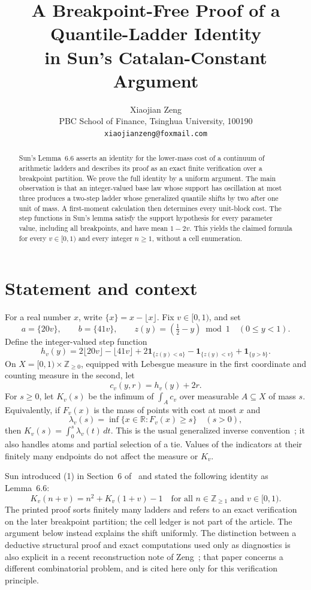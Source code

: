 \documentclass[11pt]{article}
\title{A Breakpoint-Free Proof of a Quantile-Ladder Identity\\
in Sun's Catalan-Constant Argument}
\author{Xiaojian Zeng\\
PBC School of Finance, Tsinghua University, 100190\\
\texttt{xiaojianzeng@foxmail.com}}
\date{}
\newcommand{\ind}{\mathbf 1}
\newcommand{\R}{\mathbb R}
\newcommand{\Z}{\mathbb Z}
\begin{document}
\maketitle

\begin{abstract}
Sun's Lemma~6.6 asserts an identity for the lower-mass cost of a continuum
of arithmetic ladders and describes its proof as an exact finite
verification over a breakpoint partition.  We prove the full identity by a
uniform argument.  The main observation is that an integer-valued base law
whose support has oscillation at most three produces a two-step ladder whose
generalized quantile shifts by two after one unit of mass.  A first-moment
calculation then determines every unit-block cost.  The step functions in
Sun's lemma satisfy the support hypothesis for every parameter value,
including all breakpoints, and have mean \(1-2v\).  This yields the claimed
formula for every \(v\in[0,1)\) and every integer \(n\geq1\), without a cell
enumeration.
\end{abstract}

\section{Statement and context}

For a real number \(x\), write \(\{x\}=x-\lfloor x\rfloor\).  Fix
\(v\in[0,1)\), and set
\[
 a=\{20v\},\qquad b=\{41v\},\qquad
 z(y)=(\tfrac12-y)\bmod 1\quad(0\leq y<1).
\]
Define the integer-valued step function
\[
 h_v(y)=2\lfloor20v\rfloor-\lfloor41v\rfloor
       +2\ind_{\{z(y)<a\}}-\ind_{\{z(y)<v\}}
       +\ind_{\{y>b\}}.                                      \tag{1}
\]
On \(X=[0,1)\times\Z_{\geq0}\), equipped with Lebesgue measure in the
first coordinate and counting measure in the second, let
\[
 c_v(y,r)=h_v(y)+2r.
\]
For \(s\geq0\), let \(K_v(s)\) be the infimum of
\(\int_Ac_v\) over measurable \(A\subseteq X\) of mass \(s\).  Equivalently,
if \(F_v(x)\) is the mass of points with cost at most \(x\) and
\[
 \lambda_v(s)=\inf\{x\in\R:F_v(x)\geq s\}\quad(s>0),             \tag{2}
\]
then \(K_v(s)=\int_0^s\lambda_v(t)\,dt\).  This is the usual generalized
inverse convention~\cite{EmbrechtsHofert2013}; it also handles atoms and
partial selection of a tie.  Values of the indicators at their finitely many
endpoints do not affect the measure or \(K_v\).

Sun introduced (1) in Section~6 of~\cite{Sun2026Catalan} and stated the
following identity as Lemma~6.6:
\[
 K_v(n+v)=n^2+K_v(1+v)-1
 \quad\text{for all \(n\in\Z_{\geq1}\) and \(v\in[0,1)\)}.       \tag{3}
\]
The printed proof sorts finitely many ladders and refers to an exact
verification on the later breakpoint partition; the cell ledger is not part
of the article.  The argument below instead explains the shift uniformly.
The distinction between a deductive structural proof and exact computations
used only as diagnostics is also explicit in a recent reconstruction note of
Zeng~\cite[Section~4]{Zeng2026Multiplicity}; that paper concerns a different
combinatorial problem, and is cited here only for this verification
principle.
\end{document}
